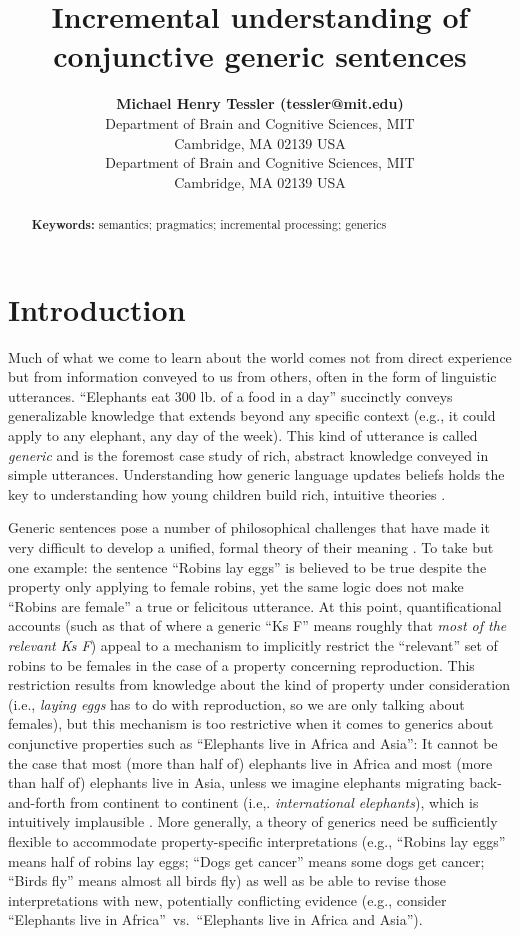\documentclass[10pt,letterpaper]{article}
\title{Incremental understanding of conjunctive generic sentences}
\author{{\large \bf Michael Henry Tessler (tessler@mit.edu)} \\
  Department of Brain and Cognitive Sciences, MIT \\
  Cambridge, MA 02139 USA
  \AND {\large \bf Roger Levy (SDJ@Macc.Wisc.Edu)} \\
  Department of Brain and Cognitive Sciences, MIT \\
  Cambridge, MA 02139 USA}
\begin{document}
\maketitle


\begin{abstract}

\textbf{Keywords:} 
semantics; pragmatics; incremental processing; generics
\end{abstract}


\section{Introduction}

Much of what we come to learn about the world comes not from direct experience but from information conveyed to us from others, often in the form of linguistic utterances. 
``Elephants eat 300 lb. of a food in a day'' succinctly conveys generalizable knowledge that extends beyond any specific context (e.g., it could apply to any elephant, any day of the week). 
This kind of utterance is called \emph{generic} and is the foremost case study of rich, abstract knowledge conveyed in simple utterances.
Understanding how generic language updates beliefs holds the key to understanding how young children build rich, intuitive theories \cite{Gelman2009}. 

Generic sentences pose a number of philosophical challenges that have made it very difficult to develop a unified, formal theory of their meaning \cite<for useful reviews, see>{genericBook, Leslie2008, Nickel2016}. 
To take but one example: the sentence ``Robins lay eggs'' is believed to be true despite the property only applying to female robins, yet the same logic does not make ``Robins are female'' a true or felicitous utterance. 
At this point, quantificational accounts (such as that of  where a generic ``Ks F'' means roughly that \emph{most of the relevant Ks F}) appeal to a mechanism to implicitly restrict the ``relevant'' set of robins to be females in the case of a property concerning reproduction. 
This restriction results from knowledge about the kind of property under consideration (i.e., \emph{laying eggs} has to do with reproduction, so we are only talking about females), but this mechanism is too restrictive when it comes to generics about conjunctive properties such as ``Elephants live in Africa and Asia'': 
It cannot be the case that most (more than half of) elephants live in Africa and most (more than half of) elephants live in Asia, unless we imagine elephants migrating back-and-forth from continent to continent (i.e,. \emph{international elephants}), which is intuitively implausible \cite{Nickel2008}.
More generally, a theory of generics need be sufficiently flexible to accommodate property-specific interpretations (e.g., ``Robins lay eggs'' means half of robins lay eggs; ``Dogs get cancer'' means some dogs get cancer; ``Birds fly'' means almost all birds fly) as well as be able to revise those interpretations with new, potentially conflicting evidence (e.g., consider ``Elephants live in Africa''~vs.~``Elephants live in Africa and Asia'').
\end{document}

